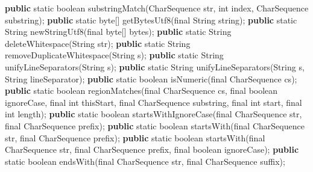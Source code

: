 \documentclass[
]{book}
\newenvironment{Shaded}{\begin{snugshade}}{\end{snugshade}}
\newcommand{\BuiltInTok}[1]{#1}
\newcommand{\DataTypeTok}[1]{\textcolor[rgb]{0.13,0.29,0.53}{#1}}
\newcommand{\FunctionTok}[1]{\textcolor[rgb]{0.00,0.00,0.00}{#1}}
\newcommand{\KeywordTok}[1]{\textcolor[rgb]{0.13,0.29,0.53}{\textbf{#1}}}
\newcommand{\NormalTok}[1]{#1}
\begin{document}
\begin{Shaded}
\begin{Highlighting}[]
\KeywordTok{public} \DataTypeTok{static} \DataTypeTok{boolean} \FunctionTok{substringMatch}\NormalTok{(}\BuiltInTok{CharSequence}\NormalTok{ str, }\DataTypeTok{int}\NormalTok{ index, }\BuiltInTok{CharSequence}\NormalTok{ substring);}
\KeywordTok{public} \DataTypeTok{static} \DataTypeTok{byte}\NormalTok{[] }\FunctionTok{getBytesUtf8}\NormalTok{(}\DataTypeTok{final} \BuiltInTok{String}\NormalTok{ string);}
\KeywordTok{public} \DataTypeTok{static} \BuiltInTok{String} \FunctionTok{newStringUtf8}\NormalTok{(}\DataTypeTok{final} \DataTypeTok{byte}\NormalTok{[] bytes);}
\KeywordTok{public} \DataTypeTok{static} \BuiltInTok{String} \FunctionTok{deleteWhitespace}\NormalTok{(}\BuiltInTok{String}\NormalTok{ str);}
\KeywordTok{public} \DataTypeTok{static} \BuiltInTok{String} \FunctionTok{removeDuplicateWhitespace}\NormalTok{(}\BuiltInTok{String}\NormalTok{ s);}
\KeywordTok{public} \DataTypeTok{static} \BuiltInTok{String} \FunctionTok{unifyLineSeparators}\NormalTok{(}\BuiltInTok{String}\NormalTok{ s);}
\KeywordTok{public} \DataTypeTok{static} \BuiltInTok{String} \FunctionTok{unifyLineSeparators}\NormalTok{(}\BuiltInTok{String}\NormalTok{ s, }\BuiltInTok{String}\NormalTok{ lineSeparator);}
\KeywordTok{public} \DataTypeTok{static} \DataTypeTok{boolean} \FunctionTok{isNumeric}\NormalTok{(}\DataTypeTok{final} \BuiltInTok{CharSequence}\NormalTok{ cs);}
\KeywordTok{public} \DataTypeTok{static} \DataTypeTok{boolean} \FunctionTok{regionMatches}\NormalTok{(}\DataTypeTok{final} \BuiltInTok{CharSequence}\NormalTok{ cs, }\DataTypeTok{final} \DataTypeTok{boolean}\NormalTok{ ignoreCase, }\DataTypeTok{final} \DataTypeTok{int}\NormalTok{ thisStart, }\DataTypeTok{final} \BuiltInTok{CharSequence}\NormalTok{ substring, }\DataTypeTok{final} \DataTypeTok{int}\NormalTok{ start, }\DataTypeTok{final} \DataTypeTok{int}\NormalTok{ length);}
\KeywordTok{public} \DataTypeTok{static} \DataTypeTok{boolean} \FunctionTok{startsWithIgnoreCase}\NormalTok{(}\DataTypeTok{final} \BuiltInTok{CharSequence}\NormalTok{ str, }\DataTypeTok{final} \BuiltInTok{CharSequence}\NormalTok{ prefix);}
\KeywordTok{public} \DataTypeTok{static} \DataTypeTok{boolean} \FunctionTok{startsWith}\NormalTok{(}\DataTypeTok{final} \BuiltInTok{CharSequence}\NormalTok{ str, }\DataTypeTok{final} \BuiltInTok{CharSequence}\NormalTok{ prefix);}
\KeywordTok{public} \DataTypeTok{static} \DataTypeTok{boolean} \FunctionTok{startsWith}\NormalTok{(}\DataTypeTok{final} \BuiltInTok{CharSequence}\NormalTok{ str, }\DataTypeTok{final} \BuiltInTok{CharSequence}\NormalTok{ prefix, }\DataTypeTok{final} \DataTypeTok{boolean}\NormalTok{ ignoreCase);}
\KeywordTok{public} \DataTypeTok{static} \DataTypeTok{boolean} \FunctionTok{endsWith}\NormalTok{(}\DataTypeTok{final} \BuiltInTok{CharSequence}\NormalTok{ str, }\DataTypeTok{final} \BuiltInTok{CharSequence}\NormalTok{ suffix);}

\end{Highlighting}
\end{Shaded}
\end{document}
